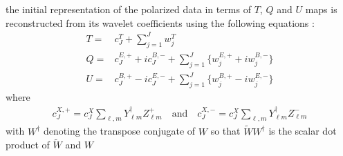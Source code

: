 the initial representation of the polarized data in terms of $T$, $Q$ and $U$ maps is reconstructed from its wavelet coefficients using the following equations : 
\begin{eqnarray}\label{eq:recons}
T =& c_{J}^T + \sum_{j=1}^{J} w_j^T \\ \nonumber
Q =& c_{J}^{E,+} + i c_{J}^{B,-} + \sum_{j=1}^{J} \Big \{ w_j^{E,+} + i w_j^{B,-} \Big \} \\ \nonumber 
U =& c_{J}^{B,+} - i c_{J}^{E,-} + \sum_{j=1}^{J} \Big \{ w_j^{B,+} - i w_j^{E,-} \Big \}
\end{eqnarray}
where
\begin{eqnarray}\label{eq:change}
c_{J}^{X,+} = c_{J}^X \sum_{\ell, m} Y_{\ell m}^{\dagger} Z_{\ell m}^+ \quad \textrm{and} \quad c_{J}^{X,-} = c_{J}^X \sum_{\ell, m} Y_{\ell m}^{\dagger} Z_{\ell m}^- 
\end{eqnarray}
with $W^\dagger$ denoting the transpose conjugate of $W$ so that $\tilde{W} W^\dagger$ is the scalar dot product of $\tilde{W}$ and $W$ 
